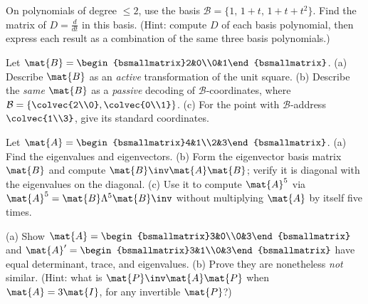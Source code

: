 \begin{exercise}
\label{ch31:ex-deriv-basis}
On polynomials of degree $\le 2$, use the basis
$\mathcal{B}=\{1,\,1+t,\,1+t+t^2\}$. Find the matrix of $D=\frac{d}{dt}$ in this
basis. (Hint: compute $D$ of each basis polynomial, then express each result as a
combination of the same three basis polynomials.)
\end{exercise}

\begin{exercise}
\label{ch31:ex-active-passive}
Let $\mat{B}=\begin{bsmallmatrix}2&0\\0&1\end{bsmallmatrix}$. (a) Describe
$\mat{B}$ as an \emph{active} transformation of the unit square. (b) Describe the
\emph{same} $\mat{B}$ as a \emph{passive} decoding of $\mathcal{B}$-coordinates,
where $\mathcal{B}=\{\colvec{2\\0},\colvec{0\\1}\}$. (c) For the point with
$\mathcal{B}$-address $\colvec{1\\3}$, give its standard coordinates.
\end{exercise}

\begin{exercise}
\label{ch31:ex-diag}
Let $\mat{A}=\begin{bsmallmatrix}4&1\\2&3\end{bsmallmatrix}$. (a) Find the
eigenvalues and eigenvectors. (b) Form the eigenvector basis matrix $\mat{B}$ and
compute $\mat{B}\inv\mat{A}\mat{B}$; verify it is diagonal with the eigenvalues on
the diagonal. (c) Use it to compute $\mat{A}^{5}$ via
$\mat{A}^5=\mat{B}\Lambda^5\mat{B}\inv$ without multiplying $\mat{A}$ by itself
five times.
\end{exercise}

\begin{exercise}
\label{ch31:ex-invariants}
(a) Show $\mat{A}=\begin{bsmallmatrix}3&0\\0&3\end{bsmallmatrix}$ and
$\mat{A}'=\begin{bsmallmatrix}3&1\\0&3\end{bsmallmatrix}$ have equal determinant,
trace, and eigenvalues. (b) Prove they are nonetheless \emph{not} similar.
(Hint: what is $\mat{P}\inv\mat{A}\mat{P}$ when $\mat{A}=3\mat{I}$, for any
invertible $\mat{P}$?)
\end{exercise}

